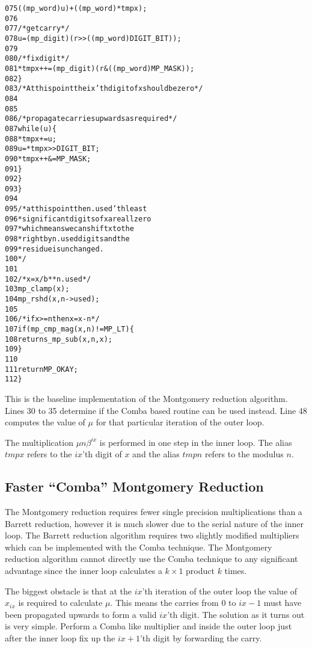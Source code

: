 \documentclass[b5paper]{book}
\begin{document}
\begin{small}
\begin{alltt}
075                     ((mp_word) u) + ((mp_word) * tmpx);
076   
077           /* get carry */
078           u       = (mp_digit)(r >> ((mp_word) DIGIT_BIT));
079   
080           /* fix digit */
081           *tmpx++ = (mp_digit)(r & ((mp_word) MP_MASK));
082         \}
083         /* At this point the ix'th digit of x should be zero */
084   
085   
086         /* propagate carries upwards as required*/
087         while (u) \{
088           *tmpx   += u;
089           u        = *tmpx >> DIGIT_BIT;
090           *tmpx++ &= MP_MASK;
091         \}
092       \}
093     \}
094   
095     /* at this point the n.used'th least
096      * significant digits of x are all zero
097      * which means we can shift x to the
098      * right by n.used digits and the
099      * residue is unchanged.
100      */
101   
102     /* x = x/b**n.used */
103     mp_clamp(x);
104     mp_rshd (x, n->used);
105   
106     /* if x >= n then x = x - n */
107     if (mp_cmp_mag (x, n) != MP_LT) \{
108       return s_mp_sub (x, n, x);
109     \}
110   
111     return MP_OKAY;
112   \}
\end{alltt}
\end{small}

This is the baseline implementation of the Montgomery reduction algorithm.  Lines 30 to 35 determine if the Comba based
routine can be used instead.  Line 48 computes the value of $\mu$ for that particular iteration of the outer loop.  

The multiplication $\mu n \beta^{ix}$ is performed in one step in the inner loop.  The alias $tmpx$ refers to the $ix$'th digit of $x$ and
the alias $tmpn$ refers to the modulus $n$.  

\subsection{Faster ``Comba'' Montgomery Reduction}

The Montgomery reduction requires fewer single precision multiplications than a Barrett reduction, however it is much slower due to the serial
nature of the inner loop.  The Barrett reduction algorithm requires two slightly modified multipliers which can be implemented with the Comba
technique.  The Montgomery reduction algorithm cannot directly use the Comba technique to any significant advantage since the inner loop calculates
a $k \times 1$ product $k$ times. 

The biggest obstacle is that at the $ix$'th iteration of the outer loop the value of $x_{ix}$ is required to calculate $\mu$.  This means the 
carries from $0$ to $ix - 1$ must have been propagated upwards to form a valid $ix$'th digit.  The solution as it turns out is very simple.  
Perform a Comba like multiplier and inside the outer loop just after the inner loop fix up the $ix + 1$'th digit by forwarding the carry.  
\end{document}
